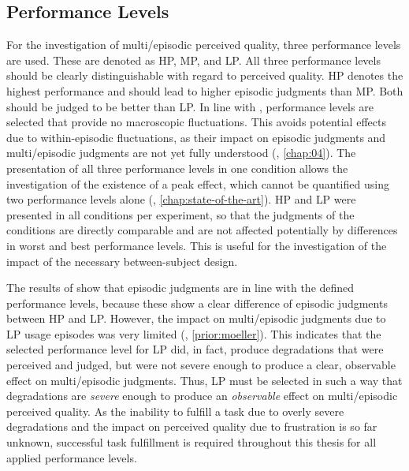\subsection{Performance Levels}
For the investigation of multi\-/episodic perceived quality, three performance levels are used.
These are denoted as \acf{HP}, \acf{MP}, and \acf{LP}.
All three performance levels should be clearly distinguishable with regard to perceived quality.
\ac{HP} denotes the highest performance and should lead to higher episodic judgments than \ac{MP}.
Both should be judged to be better than \ac{LP}.
In line with \citet{moller_single-call_2011}, performance levels are selected that provide no macroscopic fluctuations.
This avoids potential effects due to within-episodic fluctuations, as their impact on episodic judgments and multi\-/episodic judgments are not yet fully understood (\cf, \autoref{chap:04}).
The presentation of all three performance levels in one condition allows the investigation of the existence of a peak effect, which cannot be quantified using two performance levels alone (\cf, \autoref{chap:state-of-the-art}).
\ac{HP} and \ac{LP} were presented in all conditions per experiment, so that the judgments of the conditions are directly comparable and are not affected potentially by differences in worst and best performance levels.
This is useful for the investigation of the impact of the necessary between-subject design.

The results of \citet{moller_single-call_2011} show that episodic judgments are in line with the defined performance levels, because these show a clear difference of episodic judgments between \ac{HP} and \ac{LP}.
However, the impact on multi\-/episodic judgments due to \ac{LP} usage episodes was very limited (\cf, \autoref{prior:moeller}).
This indicates that the selected performance level for \ac{LP} did, in fact, produce degradations that were perceived and judged, but were not severe enough to produce a clear, observable effect on multi\-/episodic judgments.
Thus, \ac{LP} must be selected in such a way that degradations are \emph{severe} enough to produce an \emph{observable} effect on multi\-/episodic perceived quality.
As the inability to fulfill a task due to overly severe degradations and the impact on perceived quality due to frustration is so far unknown, successful task fulfillment is required throughout this thesis for all applied performance levels.


